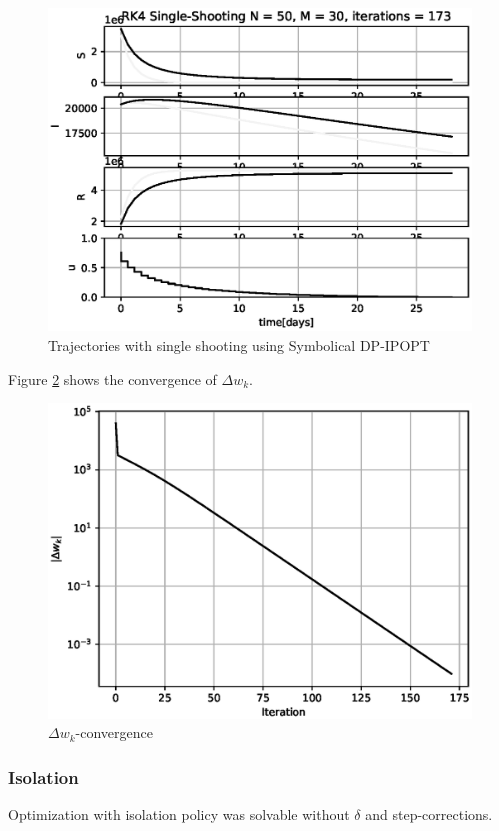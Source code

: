 \begin{figure}[H]
    \centering
    \includegraphics[width=.8\textwidth]{pythonProject/Figures/Symbolic_IPOPT_Traj.eps}
    \caption{Trajectories with single shooting using Symbolical DP-IPOPT}
    \label{fig:Symbolical_DPIPOPT_traj_Vaccine}
\end{figure}
Figure \ref{fig:Delta_wk_convergence_Vaccine} shows the convergence of $\Delta w_k$.

\begin{figure}[H]
    \centering
    \includegraphics[width=.8\textwidth]{pythonProject/Figures/Symbolic_IPOPT_error.eps}
    \caption{$\Delta w_k$-convergence}
    \label{fig:Delta_wk_convergence_Vaccine}
\end{figure}

\subsubsection{Isolation}

Optimization with isolation policy was solvable without $\delta$ and step-corrections.

